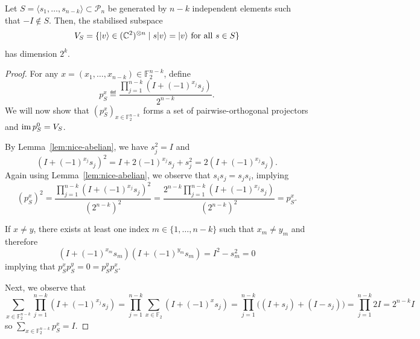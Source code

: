 \documentclass[a4paper, oneside, 12pt]{amsart}
\newcommand*{\PauliGroup}{\ensuremath{\mathcal{P}}}
\begin{document}
\begin{proposition}\label{prop:stabilised-subspace}
  Let \(S=\langle s_{1}, \dots , s_{n-k}\rangle\subset \PauliGroup_{n}\) be generated by \(n-k\) independent elements such that \(-I \notin S\).
  Then, the stabilised subspace
  \begin{equation*}
    V_S = \{ \lvert v\rangle \in (\mathbb{C}^2)^{\otimes n} \mid s \lvert v\rangle = \lvert v\rangle \text{ for all } s \in S \}
  \end{equation*}
  has dimension \( 2^k \).
\end{proposition}
\begin{proof}
  For any \( x = (x_1, \dots, x_{n-k}) \in \mathbb{F}_2^{n-k} \), define
  \begin{equation*}
    p^x_S \eqdef \frac{\prod_{j=1}^{n-k} (I + (-1)^{x_j} s_j)}{2^{n-k}}.
  \end{equation*}
  We will now show that \((p^{x}_{S})_{x\in \mathbb{F}_{2}^{n-k}}\) forms a set of pairwise-orthogonal projectors and \(\operatorname{im} p^{0}_{S} = V_{S}\).

  By Lemma~\ref{lem:nice-abelian}, we have \(s_j^2 = I\) and
  \begin{equation*}
    (I + (-1)^{x_j} s_j)^2 = I + 2(-1)^{x_j}s_j + s_j^2 = 2(I + (-1)^{x_j} s_j).
  \end{equation*}
  Again using Lemma~\ref{lem:nice-abelian}, we observe that \(s_{i}s_{j}= s_{j} s_{i}\), implying
    \begin{equation*}
      (p^x_S)^2
      = \frac{\prod_{j=1}^{n-k} (I + (-1)^{x_j} s_j)^2}{(2^{n-k})^2}
      = \frac{2^{n-k} \prod_{j=1}^{n-k} (I + (-1)^{x_j} s_j)}{(2^{n-k})^2}
      = p^x_S.
    \end{equation*}

    If \(x \neq y\), there exists at least one index \(m \in \{1, \dots, n-k\}\) such that \(x_m \neq y_m\) and therefore
    \begin{equation*}
      (I+ (-1)^{x_{m}} s_{m})(I+ (-1)^{y_{m}} s_{m}) = I^{2} - s_{m}^{2} = 0
    \end{equation*}
    implying that \(p^x_S p^y_S = 0= p^{y}_{S}p^{x}_{S}\).

   Next, we observe that
    \begin{equation*}
      \sum_{x \in \mathbb{F}_2^{n-k}} \prod_{j=1}^{n-k} (I + (-1)^{x_j} s_j)
      = \prod_{j=1}^{n-k} \sum_{x \in \mathbb{F}_{2}} (I + (-1)^{x} s_j)
      = \prod_{j=1}^{n-k} \big( (I + s_j) + (I - s_j) \big) = \prod_{j=1}^{n-k} 2I
      = 2^{n-k}I
    \end{equation*}
    so \(\sum_{x \in \mathbb{F}_2^{n-k}} p^x_S = I\).


\end{proof}
\end{document}
